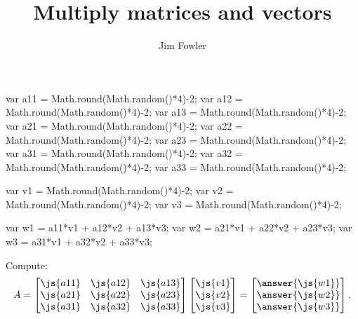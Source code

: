 \documentclass{ximera}
\title{Multiply matrices and vectors}
\author{Jim Fowler}
\begin{document}
\begin{javascript}
  var a11 = Math.round(Math.random()*4)-2;
  var a12 = Math.round(Math.random()*4)-2;
  var a13 = Math.round(Math.random()*4)-2;
  var a21 = Math.round(Math.random()*4)-2;
  var a22 = Math.round(Math.random()*4)-2;
  var a23 = Math.round(Math.random()*4)-2;
  var a31 = Math.round(Math.random()*4)-2;
  var a32 = Math.round(Math.random()*4)-2;
  var a33 = Math.round(Math.random()*4)-2;

  var v1 = Math.round(Math.random()*4)-2;
  var v2 = Math.round(Math.random()*4)-2;
  var v3 = Math.round(Math.random()*4)-2;

  var w1 = a11*v1 + a12*v2 + a13*v3;
  var w2 = a21*v1 + a22*v2 + a23*v3;
  var w3 = a31*v1 + a32*v2 + a33*v3;
\end{javascript}

\begin{problem}
  Compute:
  \[
    A = \begin{bmatrix}
      \js{a11} & \js{a12} & \js{a13} \\
      \js{a21} & \js{a22} & \js{a23} \\
      \js{a31} & \js{a32} & \js{a33} \\      
    \end{bmatrix}
    \begin{bmatrix}
      \js{v1} \\
      \js{v2} \\
      \js{v3} \\      
    \end{bmatrix} =
    \begin{bmatrix}
      \answer{\js{w1}} \\
      \answer{\js{w2}} \\
      \answer{\js{w3}} \\      
    \end{bmatrix}.    
  \]
\end{problem}
\end{document}
